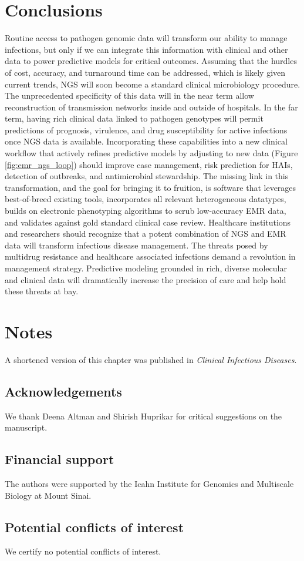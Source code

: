 \section{Conclusions}

Routine access to pathogen genomic data will transform our ability to manage infections, but only if we can integrate this information with clinical and other data to power predictive models for critical outcomes. Assuming that the hurdles of cost, accuracy, and turnaround time can be addressed, which is likely given current trends, NGS will soon become a standard clinical microbiology procedure. The unprecedented specificity of this data will in the near term allow reconstruction of transmission networks inside and outside of hospitals. In the far term, having rich clinical data linked to pathogen genotypes will permit predictions of prognosis, virulence, and drug susceptibility for active infections once NGS data is available. Incorporating these capabilities into a new clinical workflow that actively refines predictive models by adjusting to new data (Figure \ref{fig:emr_ngs_loop}) should improve case management, risk prediction for HAIs, detection of outbreaks, and antimicrobial stewardship. The missing link in this transformation, and the goal for bringing it to fruition, is software that leverages best-of-breed existing tools, incorporates all relevant heterogeneous datatypes, builds on electronic phenotyping algorithms to scrub low-accuracy EMR data, and validates against gold standard clinical case review.
Healthcare institutions and researchers should recognize that a potent combination of NGS and EMR data will transform infectious disease management. The threats posed by multidrug resistance and healthcare associated infections demand a revolution in management strategy. Predictive modeling grounded in rich, diverse molecular and clinical data will dramatically increase the precision of care and help hold these threats at bay.

\section*{Notes}

A shortened version of this chapter was published in \textit{Clinical Infectious Diseases}.\autocite{Pak2015}

\subsection{Acknowledgements}

We thank Deena Altman and Shirish Huprikar for critical suggestions on the manuscript.

\subsection{Financial support}

The authors were supported by the Icahn Institute for Genomics and Multiscale Biology at Mount Sinai.

\subsection{Potential conflicts of interest}
We certify no potential conflicts of interest.
